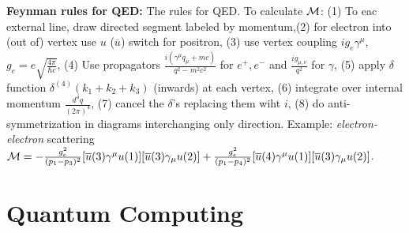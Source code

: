 {\bf Feynman rules for QED:}  The rules for QED.
To calculate ${\cal M}$: (1) To eac external line, draw directed segment labeled by momentum,(2) for electron into (out of)
vertex use $u$ (${\overline u}$) switch for positron, (3) use vertex coupling $ig_e \gamma^{\mu}$, $g_e= e {\sqrt {\frac {4 \pi} {\hbar c}}}$,
(4) Use propagators ${\frac {i(\gamma^{\mu} q_{\mu} + mc)} {q^2-m^2 c^2}}$ for $e^+, e^-$ and ${\frac {ig_{\mu, \nu}} {q^2}}$ for
$\gamma$, (5) apply $\delta$ function $\delta^{(4)}(k_1+k_2+k_3)$ (inwards) at each vertex, (6) integrate over internal momentum
${\frac {d^4 q} {(2 \pi)^4}}$, (7) cancel the $\delta$'s replacing them wiht $i$, (8) do anti-symmetrization in diagrams interchanging only
direction.  Example: \emph{electron-electron} scattering ${\cal M}= 
- {\frac {g_e^2}{(p_1-p_3)^2}} [{\overline u}(3) \gamma^{\mu}u(1)] [{\overline u}(3) \gamma_{\mu} u(2)]
+ {\frac {g_e^2}{(p_1-p_4)^2}} [{\overline u}(4) \gamma^{\mu}u(1)] [{\overline u}(3) \gamma_{\mu} u(2)] $.
\chapter{Quantum Computing}
